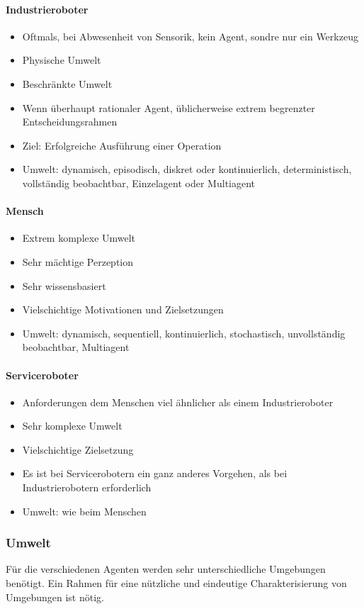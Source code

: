 \paragraph{Industrieroboter}
\begin{itemize}
	\item Oftmals, bei Abwesenheit von Sensorik, kein Agent, sondre nur ein Werkzeug
	\item Physische Umwelt
	\item Beschränkte Umwelt
	\item Wenn überhaupt rationaler Agent, üblicherweise extrem begrenzter Entscheidungsrahmen
	\item Ziel: Erfolgreiche Ausführung einer Operation
	\item Umwelt: dynamisch, episodisch, diskret oder kontinuierlich, deterministisch, vollständig beobachtbar, Einzelagent oder Multiagent
\end{itemize}
\paragraph{Mensch}
\begin{itemize}
	\item Extrem komplexe Umwelt
	\item Sehr mächtige Perzeption
	\item Sehr wissensbasiert
	\item Vielschichtige Motivationen und Zielsetzungen
	\item Umwelt: dynamisch, sequentiell, kontinuierlich, stochastisch, unvollständig beobachtbar, Multiagent
\end{itemize}
\paragraph{Serviceroboter}
\begin{itemize}
	\item Anforderungen dem Menschen viel ähnlicher als einem Industrieroboter
	\item Sehr komplexe Umwelt
	\item Vielschichtige Zielsetzung
	\item Es ist bei Servicerobotern ein ganz anderes Vorgehen, als bei Industrierobotern erforderlich
	\item Umwelt: wie beim Menschen
\end{itemize}

\subsubsection{Umwelt}
Für die verschiedenen Agenten werden sehr unterschiedliche Umgebungen benötigt.
Ein Rahmen für eine nützliche und eindeutige Charakterisierung von Umgebungen ist nötig.
